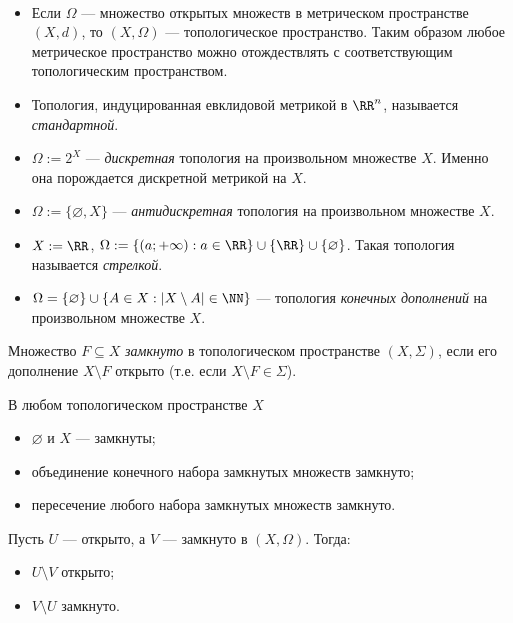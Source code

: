 \documentclass[12pt,a4paper]{article}
\begin{document}
    \begin{example}\ 
        \begin{itemize}
            \item Если $\Omega$ --- множество открытых множеств в метрическом пространстве $(X, d)$, то $(X, \Omega)$ --- топологическое пространство. Таким образом любое метрическое пространство можно отождествлять с соответствующим топологическим пространством.
            \item Топология, индуцированная евклидовой метрикой в $\RR^n$, называется \emph{стандартной}.
            \item $\Omega := 2^X$ --- \emph{дискретная} топология на произвольном множестве $X$. Именно она порождается дискретной метрикой на $X$.
            \item $\Omega := \{\varnothing, X\}$ --- \emph{антидискретная} топология на произвольном множестве $X$.
            \item $X := \RR$, $\Omega := \{(a; +\infty) : a \in \RR\} \cup \{\RR\} \cup \{\varnothing\}$. Такая топология называется \emph{стрелкой}.
            \item $\Omega = \{\varnothing\} \cup \{A \in X: |X\setminus A| \in \NN\}$ --- топология \emph{конечных дополнений} на произвольном множестве $X$.
        \end{itemize}
    \end{example}

    \begin{definition}
        Множество $F \subseteq X$ \emph{замкнуто} в топологическом пространстве $(X, \Sigma)$, если его дополнение $X \setminus F$ открыто (т.е. если $X \setminus F \in \Sigma$).
    \end{definition}

    \begin{theorem}
        В любом топологическом пространстве $X$
        \begin{itemize}
            \item $\varnothing$ и $X$ --- замкнуты;
            \item объединение конечного набора замкнутых множеств замкнуто;
            \item пересечение любого набора замкнутых множеств замкнуто.
        \end{itemize}
    \end{theorem}

    \begin{theorem}
        Пусть $U$ --- открыто, а $V$ --- замкнуто в $(X, \Omega)$. Тогда:
        \begin{multicols}{2}
            \begin{itemize}
                \item $U \setminus V$ открыто;
                \item $V \setminus U$ замкнуто.
            \end{itemize}
        \end{multicols}
    \end{theorem}
\end{document}
